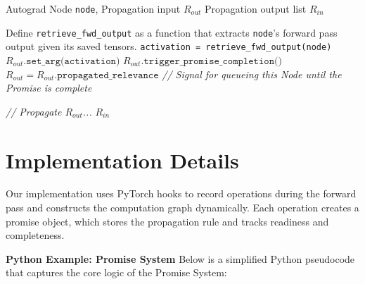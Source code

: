 \documentclass{article}
\begin{document}
\begin{algorithm}[H]
  \caption{Arg Node Propagation Function Promise Handling}
  \label{alg:argnode-propagation}
  \begin{algorithmic}[1]
    \Require Autograd Node \texttt{node}, Propagation input $R_{out}$
    \Ensure Propagation output list $R_{in}$

     
      \State Define \texttt{retrieve\_fwd\_output} as a function that extracts \texttt{node}'s forward pass output given its saved tensors.
      \State \texttt{activation = retrieve\_fwd\_output(node)}
      \State $R_{out}\texttt{.set\_arg(activation)}$
      \State $R_{out}\texttt{.trigger\_promise\_completion()}$
       
        $R_{out} = R_{out}\texttt{.propagated\_relevance}$
      \Else
        \State \textit{// Signal for queueing this Node until the Promise is complete}
        \State \Return
      \EndIf
    \EndIf

    \State \textit{// Propagate $R_{out}$...}
    \State \Return $R_{in}$
  \end{algorithmic}
\end{algorithm}

\section{Implementation Details}
Our implementation uses PyTorch hooks to record operations during the forward pass and constructs the computation graph dynamically. Each operation creates a promise object, which stores the propagation rule and tracks readiness and completeness.

\textbf{Python Example: Promise System}
Below is a simplified Python pseudocode that captures the core logic of the Promise System:
\end{document}
